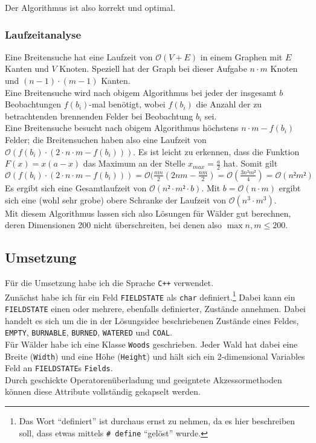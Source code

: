 Der Algorithmus ist also korrekt und optimal.

\subsubsection{Laufzeitanalyse}
Eine Breitensuche hat eine Laufzeit von $\mathcal{O}(V + E)$ in einem Graphen mit $E$ Kanten und $V$ Knoten. Speziell hat der Graph bei dieser Aufgabe $n\cdot m$ Knoten und $(n-1)\cdot (m-1)$ Kanten.\\
Eine Breitensuche wird nach obigem Algorithmus bei jeder der insgesamt $b$ Beobachtungen $f(b_i)$-mal benötigt, wobei $f(b_i)$ die Anzahl der zu betrachtenden brennenden Felder bei Beobachtung $b_i$ sei.\\
Eine Breitensuche besucht nach obigem Algorithmus höchstens $n\cdot m - f(b_i)$ Felder; die Breitensuchen haben also eine Laufzeit von $\mathcal{O}(f(b_i)\cdot (2\cdot n\cdot m - f(b_i)))$. Es ist leicht zu erkennen, dass die Funktion $F(x) = x(a-x)$ das Maximum an der Stelle $x_{max} = \frac{a}{2}$ hat. Somit gilt $\mathcal{O}(f(b_i)\cdot (2\cdot n\cdot m - f(b_i))) = \mathcal{O}(\frac{nm}{2}(2nm - \frac{nm}{2}) = \mathcal{O}(\frac{3n²m²}{4}) = \mathcal{O}(n²m²)$
 Es ergibt sich eine Gesamtlaufzeit von $\mathcal{O}(n²\cdot m² \cdot b)$. Mit $b = \mathcal{O}(n\cdot m)$ ergibt sich eine (wohl sehr grobe) obere Schranke der Laufzeit von $\mathcal{O}(n^3 \cdot m^3)$.\\
Mit diesem Algorithmus lassen sich also Lösungen für Wälder gut berechnen, deren Dimensionen 200 nicht überschreiten, bei denen also $\max{n,m} \leq 200$.

\subsection{Umsetzung}
Für die Umsetzung habe ich die Sprache \texttt{C++} verwendet.\\
Zunächst habe ich für ein Feld \texttt{FIELDSTATE} als \texttt{char} definiert.\footnote{Das Wort \enquote{definiert} ist durchaus ernst zu nehmen, da es hier beschreiben soll, dass etwas mittels \texttt{\# define} \enquote{gelöst} wurde.} Dabei kann ein \texttt{FIELDSTATE} einen oder mehrere, ebenfalls definierter, Zustände annehmen. Dabei handelt es sich um die in der Lösungsidee beschriebenen Zustände eines Feldes, \texttt{EMPTY}, \texttt{BURNABLE}, \texttt{BURNED}, \texttt{WATERED} und \texttt{COAL}.\\
Für Wälder habe ich eine Klasse \texttt{Woods} geschrieben. Jeder Wald hat dabei eine Breite (\texttt{Width}) und eine Höhe (\texttt{Height}) und hält sich ein 2-dimensional Variables Feld an \texttt{FIELDSTATE}s \texttt{Fields}.\\
Durch geschickte Operatorenüberladung und geeigntete Akzessormethoden können diese Attribute vollständig gekapselt werden.

